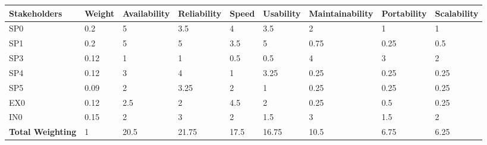 \begin{table}
\begin{tabular}{|l|l|l|l|l|}
		\hline
	\end{tabular}
\end{table}


\begin{table}
	\centering
	\begin{tabular}{|l|l|l|l|l|l|l|l|l|} 
		\hline
		\textbf{Stakeholders}    & \textbf{Weight} & \textbf{Availability} & \textbf{Reliability} & \textbf{Speed} & \textbf{Usability} & \textbf{Maintainability} & \textbf{Portability} & \textbf{Scalability}  \\ 
		\hline
		SP0                      & 0.2             & 5                     & 3.5                  & 4              & 3.5                & 2                        & 1                    & 1                     \\ 
		\hline
		SP1                      & 0.2             & 5                     & 5                    & 3.5            & 5                  & 0.75                     & 0.25                 & 0.5                   \\ 
		\hline
		SP3                      & 0.12            & 1                     & 1                    & 0.5            & 0.5                & 4                        & 3                    & 2                     \\ 
		\hline
		SP4                      & 0.12            & 3                     & 4                    & 1              & 3.25               & 0.25                     & 0.25                 & 0.25                  \\ 
		\hline
		SP5                      & 0.09            & 2                     & 3.25                 & 2              & 1                  & 0.25                     & 0.25                 & 0.25                  \\ 
		\hline
		EX0                      & 0.12            & 2.5                   & 2                    & 4.5            & 2                  & 0.25                     & 0.5                  & 0.25                  \\ 
		\hline
		IN0                      & 0.15            & 2                     & 3                    & 2              & 1.5                & 3                        & 1.5                  & 2                     \\ 
		\hline
		\textbf{Total Weighting} & 1               & 20.5                  & 21.75                & 17.5           & 16.75              & 10.5                     & 6.75                 & 6.25                  \\
		\hline
	\end{tabular}
\end{table}
